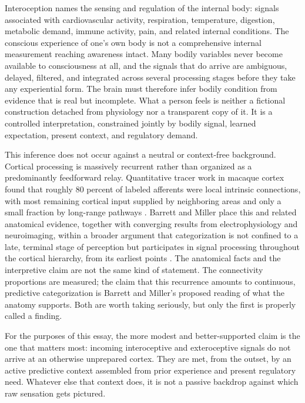 \documentclass[11pt]{article}
\begin{document}
Interoception names the sensing and regulation of the internal body: signals associated with cardiovascular activity, respiration, temperature, digestion, metabolic demand, immune activity, pain, and related internal conditions. The conscious experience of one's own body is not a comprehensive internal measurement reaching awareness intact. Many bodily variables never become available to consciousness at all, and the signals that do arrive are ambiguous, delayed, filtered, and integrated across several processing stages before they take any experiential form. The brain must therefore infer bodily condition from evidence that is real but incomplete. What a person feels is neither a fictional construction detached from physiology nor a transparent copy of it. It is a controlled interpretation, constrained jointly by bodily signal, learned expectation, present context, and regulatory demand.

This inference does not occur against a neutral or context-free background. Cortical processing is massively recurrent rather than organized as a predominantly feedforward relay. Quantitative tracer work in macaque cortex found that roughly 80 percent of labeled afferents were local intrinsic connections, with most remaining cortical input supplied by neighboring areas and only a small fraction by long-range pathways \citep{Markov2011}. Barrett and Miller place this and related anatomical evidence, together with converging results from electrophysiology and neuroimaging, within a broader argument that categorization is not confined to a late, terminal stage of perception but participates in signal processing throughout the cortical hierarchy, from its earliest points \citep{BarrettMiller2026}. The anatomical facts and the interpretive claim are not the same kind of statement. The connectivity proportions are measured; the claim that this recurrence amounts to continuous, predictive categorization is Barrett and Miller's proposed reading of what the anatomy supports. Both are worth taking seriously, but only the first is properly called a finding.

For the purposes of this essay, the more modest and better-supported claim is the one that matters most: incoming interoceptive and exteroceptive signals do not arrive at an otherwise unprepared cortex. They are met, from the outset, by an active predictive context assembled from prior experience and present regulatory need. Whatever else that context does, it is not a passive backdrop against which raw sensation gets pictured.
\end{document}

